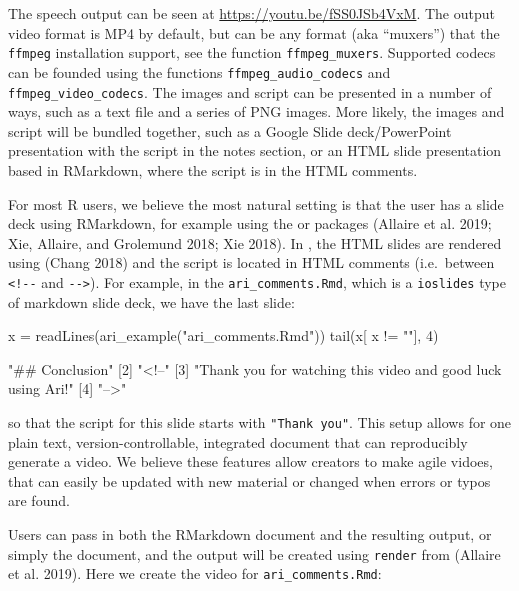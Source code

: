 The speech output can be seen at \url{https://youtu.be/fSS0JSb4VxM}. The
output video format is MP4 by default, but can be any format (aka
``muxers'') that the \texttt{ffmpeg} installation support, see the
function \texttt{ffmpeg\_muxers}. Supported codecs can be founded using
the functions \texttt{ffmpeg\_audio\_codecs} and
\texttt{ffmpeg\_video\_codecs}. The images and script can be presented
in a number of ways, such as a text file and a series of PNG images.
More likely, the images and script will be bundled together, such as a
Google Slide deck/PowerPoint presentation with the script in the notes
section, or an HTML slide presentation based in RMarkdown, where the
script is in the HTML comments.

For most R users, we believe the most natural setting is that the user
has a slide deck using RMarkdown, for example using the
 or  packages (Allaire et al. 2019;
Xie, Allaire, and Grolemund 2018; Xie 2018). In , the HTML
slides are rendered using  (Chang 2018) and the script
is located in HTML comments (i.e.~between \texttt{\textless{}!-\/-} and
\texttt{-\/-\textgreater{}}). For example, in the
\texttt{ari\_comments.Rmd}, which is a \texttt{ioslides} type of
markdown slide deck, we have the last slide:

\begin{Schunk}
\begin{Sinput}
x = readLines(ari_example("ari_comments.Rmd"))
tail(x[ x != ""], 4)
\end{Sinput}
\begin{Soutput}
[1] "## Conclusion"                                             
[2] "<!--"                                                      
[3] "Thank you for watching this video and good luck using Ari!"
[4] "-->"                                                       
\end{Soutput}
\end{Schunk}

so that the script for this slide starts with \texttt{"Thank\ you"}.
This setup allows for one plain text, version-controllable, integrated
document that can reproducibly generate a video. We believe these
features allow creators to make agile vidoes, that can easily be updated
with new material or changed when errors or typos are found.

Users can pass in both the RMarkdown document and the resulting output,
or simply the document, and the output will be created using
\texttt{render} from  (Allaire et al. 2019). Here we
create the video for \texttt{ari\_comments.Rmd}:

